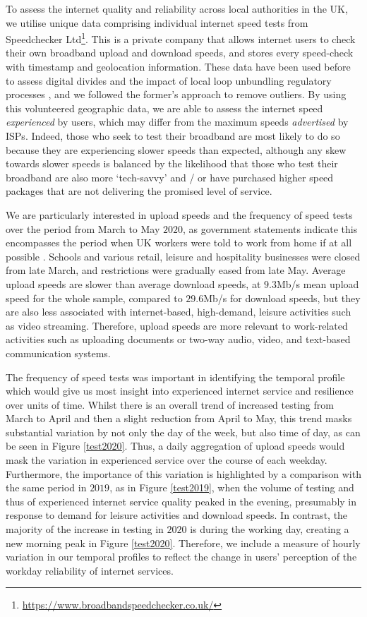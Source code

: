 \documentclass[]{interact}
\theoremstyle{plain}%
\theoremstyle{definition}
\theoremstyle{remark}
\begin{document}
To assess the internet quality and reliability across local authorities
in the UK, we utilise unique data comprising individual internet speed
tests from Speedchecker Ltd\footnote{\url{https://www.broadbandspeedchecker.co.uk/}}.
This is a private company that allows internet users to check their own
broadband upload and download speeds, and stores every speed-check with
timestamp and geolocation information. These data have been used before
to assess digital divides \citep{riddlesden2014broadband} and the impact
of local loop unbundling regulatory processes
\citep{nardotto2015unbundling}, and we followed the former's approach to
remove outliers. By using this volunteered geographic data, we are able
to assess the internet speed \emph{experienced} by users, which may
differ from the maximum speeds \emph{advertised} by ISPs. Indeed, those
who seek to test their broadband are most likely to do so because they
are experiencing slower speeds than expected, although any skew towards
slower speeds is balanced by the likelihood that those who test their
broadband are also more `tech-savvy' and / or have purchased higher
speed packages that are not delivering the promised level of service.

We are particularly interested in upload speeds and the frequency of
speed tests over the period from March to May \(2020\), as government
statements indicate this encompasses the period when UK workers were
told to work from home if at all possible \citep{GovUK2020}. Schools and
various retail, leisure and hospitality businesses were closed from late
March, and restrictions were gradually eased from late May. Average
upload speeds are slower than average download speeds, at \(9.3\)Mb/s
mean upload speed for the whole sample, compared to \(29.6\)Mb/s for
download speeds, but they are also less associated with internet-based,
high-demand, leisure activities such as video streaming. Therefore,
upload speeds are more relevant to work-related activities such as
uploading documents or two-way audio, video, and text-based
communication systems.

The frequency of speed tests was important in identifying the temporal
profile which would give us most insight into experienced internet
service and resilience over units of time. Whilst there is an overall
trend of increased testing from March to April and then a slight
reduction from April to May, this trend masks substantial variation by
not only the day of the week, but also time of day, as can be seen in
Figure \ref{test2020}. Thus, a daily aggregation of upload speeds would
mask the variation in experienced service over the course of each
weekday. Furthermore, the importance of this variation is highlighted by
a comparison with the same period in \(2019\), as in Figure
\ref{test2019}, when the volume of testing and thus of experienced
internet service quality peaked in the evening, presumably in response
to demand for leisure activities and download speeds. In contrast, the
majority of the increase in testing in \(2020\) is during the working
day, creating a new morning peak in Figure \ref{test2020}. Therefore, we
include a measure of hourly variation in our temporal profiles to
reflect the change in users' perception of the workday reliability of
internet services.
\end{document}
